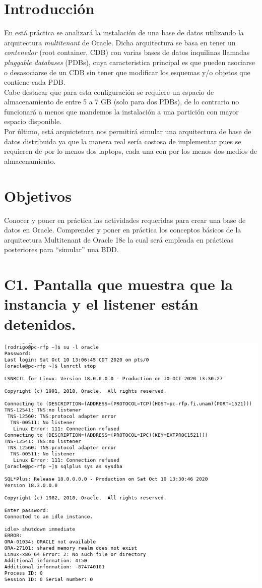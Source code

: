 \documentclass{article}
\begin{document}
\section*{Introducción}
En está práctica se analizará la instalación de una base de datos utilizando 
la arquitectura \textit{multitenant} de Oracle. Dicha arquitectura se basa en 
tener un \textit{contenedor} (root container, CDB) con varias bases de datos
inquilinas llamadas \textit{pluggable databases} (PDBs), cuya caracteristica 
principal es que pueden asociarse o desasociarse de un CDB sin tener que 
modificar los esquemas y/o objetos que contiene cada PDB.\\

Cabe destacar que para esta configuración se requiere un espacio de 
almacenamiento de entre 5 a 7 GB (solo para dos PDBs), de lo contrario no 
funcionará a menos que mandemos la instalación a una partición con mayor 
espacio disponible.\\ 

Por último, está arquictetura nos permitirá simular una arquitectura de base
de datos distribuida ya que la manera real sería costosa de implementar pues 
se requieren de por lo menos dos laptops, cada una con por los menos dos 
medios de almacenamiento.

\section*{Objetivos}
Conocer y poner en práctica las actividades requeridas para crear una base de 
datos en Oracle. Comprender y poner en práctica los conceptos básicos de la 
arquitectura Multitenant de Oracle 18c la cual será empleada en prácticas 
posteriores para ``simular'' una BDD.

\section*{C1. Pantalla que muestra que la instancia y
el listener están detenidos.}

\includegraphics[width=0.8\linewidth]{c1}
\end{document}
